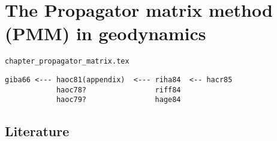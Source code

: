 \chapter{The Propagator matrix method (PMM) in geodynamics} 

\begin{flushright} {\tiny {\color{gray} \tt chapter\_propagator\_matrix.tex}} \end{flushright}

\begin{verbatim}
giba66 <--- haoc81(appendix)  <--- riha84  <-- hacr85 
            haoc78?                riff84
            haoc79?                hage84

\end{verbatim}

\section{Literature}

